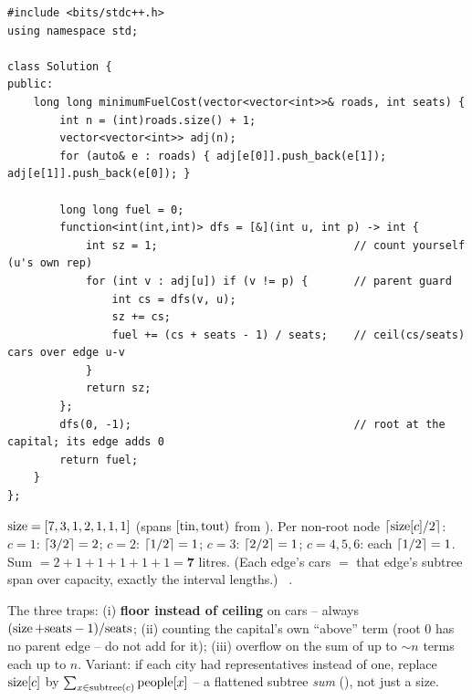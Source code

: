 \begin{lstlisting}[caption={Minimum Fuel Cost via subtree sizes (LeetCode 2477)}, label={lst:c24-fuel}]
#include <bits/stdc++.h>
using namespace std;

class Solution {
public:
    long long minimumFuelCost(vector<vector<int>>& roads, int seats) {
        int n = (int)roads.size() + 1;
        vector<vector<int>> adj(n);
        for (auto& e : roads) { adj[e[0]].push_back(e[1]); adj[e[1]].push_back(e[0]); }

        long long fuel = 0;
        function<int(int,int)> dfs = [&](int u, int p) -> int {
            int sz = 1;                              // count yourself (u's own rep)
            for (int v : adj[u]) if (v != p) {       // parent guard
                int cs = dfs(v, u);
                sz += cs;
                fuel += (cs + seats - 1) / seats;    // ceil(cs/seats) cars over edge u-v
            }
            return sz;
        };
        dfs(0, -1);                                  // root at the capital; its edge adds 0
        return fuel;
    }
};
\end{lstlisting}

\begin{tracebox}[$G$ rooted at $0$, \code{seats}$=2$]
$\operatorname{size}=[7,3,1,2,1,1,1]$ (spans $[\operatorname{tin},\operatorname{tout})$ from ). Per non-root node
$\lceil\operatorname{size}[c]/2\rceil$: $c{=}1$: $\lceil3/2\rceil=2$; $c{=}2$: $\lceil1/2\rceil=1$; $c{=}3$:
$\lceil2/2\rceil=1$; $c{=}4,5,6$: each $\lceil1/2\rceil=1$. Sum $=2+1+1+1+1+1=\mathbf{7}$ litres.
(Each edge's cars $=$ that edge's subtree span over capacity, exactly the interval lengths.)
\checkmark\ .
\end{tracebox}


\begin{warningbox}
The three traps: (i) \textbf{floor instead of ceiling} on cars -- always
$(\operatorname{size} + \text{seats} - 1)/\text{seats}$; (ii) counting the capital's own ``above'' term
(root $0$ has no parent edge -- do not add for it); (iii)  overflow on the sum of
up to $\sim n$ terms each up to $n$. Variant: if each city had 
representatives instead of one, replace $\operatorname{size}[c]$ by $\sum_{x\in\operatorname{subtree}(c)}\text{people}[x]$
-- a flattened subtree \emph{sum} (), not just a size.
\end{warningbox}

